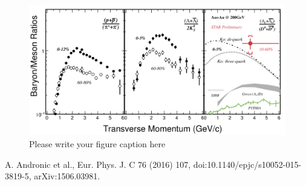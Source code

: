 \documentclass{webofc}
\begin{document}
\begin{figure}[ht]
\centering
\includegraphics[width=.90\textwidth]{Plots/LambdacSTARAuAu}
\caption{Please write your figure caption here}
\label{recombinationBaryons}     
\end{figure}


\begin{thebibliography}{}
 A. Andronic et al., Eur. Phys. J. C 76 (2016) 107, doi:10.1140/epjc/s10052-015-3819-5, arXiv:1506.03981. 
\end{thebibliography}
\end{document}
